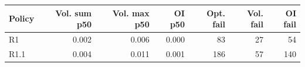 \begin{tabular}{lrrrrrr}
\toprule
Policy & Vol. sum p50 & Vol. max p50 & OI p50 & Opt. fail & Vol. fail & OI fail \\
\midrule
R1 & 0.002 & 0.006 & 0.000 & 83 & 27 & 54 \\
R1.1 & 0.004 & 0.011 & 0.001 & 186 & 57 & 140 \\
\bottomrule
\end{tabular}
